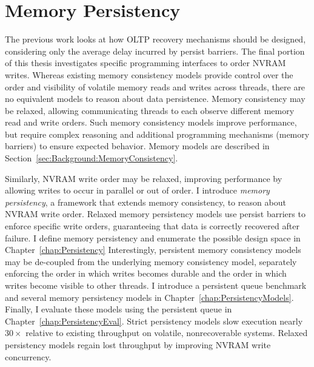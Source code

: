 \section{Memory Persistency}
\label{sec:Intro:PMC}

The previous work looks at how OLTP recovery mechanisms should be designed, considering only the average delay incurred by persist barriers.
The final portion of this thesis investigates specific programming interfaces to order NVRAM writes.
Whereas existing memory consistency models provide control over the order and visibility of volatile memory reads and writes across threads, there are no equivalent models to reason about data persistence.
Memory consistency may be relaxed, allowing communicating threads to each observe different memory read and write orders.
Such memory consistency models improve performance, but require complex reasoning and additional programming mechanisms (memory barriers) to ensure expected behavior.
Memory models are described in Section~\ref{sec:Background:MemoryConsistency}.

Similarly, NVRAM write order may be relaxed, improving performance by allowing writes to occur in parallel or out of order.
I introduce \emph{memory persistency}, a framework that extends memory consistency, to reason about NVRAM write order.
Relaxed memory persistency models use persist barriers to enforce specific write orders, guaranteeing that data is correctly recovered after failure.
I define memory persistency and enumerate the possible design space in Chapter~\ref{chap:Persistency}
Interestingly, persistent memory consistency models may be de-coupled from the underlying memory consistency model, separately enforcing the order in which writes becomes durable and the order in which writes become visible to other threads.
I introduce a persistent queue benchmark and several memory persistency models in Chapter~\ref{chap:PersistencyModels}.
Finally, I evaluate these models using the persistent queue in Chapter~\ref{chap:PersistencyEval}.
Strict persistency models slow execution nearly $30\times$ relative to existing throughput on volatile, nonrecoverable systems.
Relaxed persistency models regain lost throughput by improving NVRAM write concurrency.


